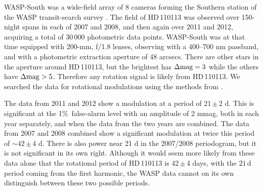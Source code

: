 \documentclass[fleqn,usenatbib]{mnras}
\newcommand{\vsini}{$v\sin{i}$}
\newcommand{\Tstar}{HD\,110113}
\begin{document}
WASP-South was a wide-field array of 8 cameras forming the Southern station of the WASP transit-search survey \citep{2006PASP..118.1407P}. The field of \Tstar{} was observed over 150-night spans in each of 2007 and 2008, and then again over 2011 and 2012, acquiring a total of 30\,000 photometric data points. 
WASP-South was at that time equipped with 200-mm, f/1.8 lenses, observing with a 400--700 nm passband, and with a photometric extraction aperture of 48 arcsecs. 
There are other stars in the aperture around \Tstar{}, but the brightest has  $\Delta{\rm mag}=3$ while the others have $\Delta{\rm mag}>5$. 
Therefore any rotation signal is likely from \Tstar{}.
We searched the data for rotational modulations using the methods from \citet{2011PASP..123..547M}.

The data from 2011 and 2012 show a modulation at a period of 21\,$\pm$\,2 d.
This is significant at the 1\%\ false-alarm level with an amplitude of 2 mmag, both in each year separately, and when the data from the two years are combined.
The data from 2007 and 2008 combined show a significant modulation at twice this period of $\sim42$\,$\pm$\,4 d.
There is also power near 21 d in the 2007/2008 periodogram, but it is not significant in its own right.
Although it would seem more likely from these data alone that the rotational period of \Tstar{} is 42\,$\pm$\,4 days, with the $21$\,d period coming from the first harmonic, the WASP data cannot on its own distinguish between these two possible periods.
\end{document}
